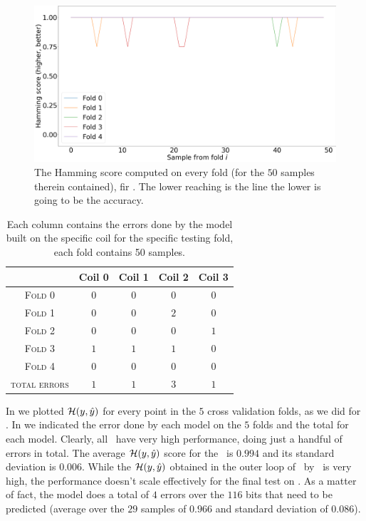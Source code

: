 \begin{figure}[!ht]
	\centering
	\includegraphics[width=0.7\linewidth]{img/svc_qlp_hs.png}
	\caption{The Hamming score computed on every fold (for the $50$ samples therein contained),
	fir \svcs. The lower reaching is the line the lower is going to be the accuracy.}
	\label{fig:svc-qlp-hs}
\end{figure}
\begin{table}[!ht]
	\setlength{\tabcolsep}{6pt}
	\centering
	\begin{tabular}{ccccc}
		\toprule
		\textbf{}                     & \textbf{Coil 0}    & \textbf{Coil 1} & \textbf{Coil 2} & \textbf{Coil 3}
		\\
		\midrule
		\textsc{Fold 0}         & $0$           & $0$           & $0$            & $0$            \\
		\textsc{Fold 1}         & $0$		& $0$		& $2$            & $0$		  \\
		\textsc{Fold 2}		& $0$           & $0$		& $0$            & $1$            \\
		\textsc{Fold 3}         & $1$           & $1$ 		& $1$            & $0$            \\
		\textsc{Fold 4}         & $0$		& $0$           & $0$            & $0$            \\
		\midrule
		\textsc{total errors}	& $1$		& $1$		& $3$		& $1$
		\\
		\bottomrule
	\end{tabular}
	\caption{Each column contains the errors done by the model built on the specific coil for the specific testing fold, each fold contains 50 samples.}\label{tbl:svc-err}
\end{table}

In  we plotted $\mathcal{H}(y, \hat{y})$ for every point in the $5$ cross validation folds, as we
did for \dts. In  we indicated the error done by each model on the $5$ folds and
the total for each model. Clearly, all \svcs\ have very high performance, doing just a handful of
errors in total. The average $\mathcal{H}(y, \hat{y})$ score for the \svc\ is $0.994$ and its standard deviation is $0.006$.
While the $\mathcal{H}(y, \hat{y})$ obtained in the outer loop of \ncv\ by \svcs\ is very high, the performance doesn't
scale effectively for the final test on \db. As a matter of fact, the model does a total of $4$
errors over the $116$ bits that need to be predicted (average over the $29$ samples of $0.966$ and
standard deviation of $0.086$).




